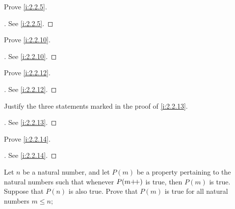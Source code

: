 \exercisesection

\begin{ex}\label{i:ex:2.2.1}
  Prove \cref{i:2.2.5}.
\end{ex}

\begin{proof}[]
  See \cref{i:2.2.5}.
\end{proof}

\begin{ex}\label{i:ex:2.2.2}
  Prove \cref{i:2.2.10}.
\end{ex}

\begin{proof}[]
  See \cref{i:2.2.10}.
\end{proof}

\begin{ex}\label{i:ex:2.2.3}
  Prove \cref{i:2.2.12}.
\end{ex}

\begin{proof}[]
  See \cref{i:2.2.12}.
\end{proof}

\begin{ex}\label{i:ex:2.2.4}
  Justify the three statements marked in the proof of \cref{i:2.2.13}.
\end{ex}

\begin{proof}[]
  See \cref{i:2.2.13}.
\end{proof}

\begin{ex}\label{i:ex:2.2.5}
  Prove \cref{i:2.2.14}.
\end{ex}

\begin{proof}[]
  See \cref{i:2.2.14}.
\end{proof}

\begin{ex}\label{i:ex:2.2.6}
  Let \(n\) be a natural number, and let \(P(m)\) be a property pertaining to the natural numbers such that whenever \(P(m{+}\!{+})\) is true, then \(P(m)\) is true.
  Suppose that \(P(n)\) is also true.
  Prove that \(P(m)\) is true for all natural numbers \(m \leq n\);
\end{ex}


